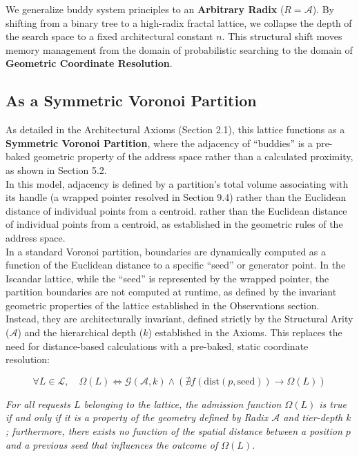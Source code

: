 \documentclass[11pt]{article}
\begin{document}
We generalize buddy system principles to an \textbf{Arbitrary Radix} ($R=\mathcal{A}$). By shifting from a binary tree to a high-radix fractal lattice, we collapse the depth of the search space to a fixed architectural constant $n$. This structural shift moves memory management from the domain of probabilistic searching to the domain of \textbf{Geometric Coordinate Resolution}.

\subsection{As a Symmetric Voronoi Partition}
As detailed in the Architectural Axioms (Section 2.1), this lattice functions as a \textbf{Symmetric Voronoi Partition}, where the adjacency of ``buddies'' is a pre-baked geometric property of the address space rather than a calculated proximity, as shown in Section 5.2.\\ 

In this model, adjacency is defined by a partition's total volume associating with its handle (a wrapped pointer resolved in Section 9.4) rather than the Euclidean distance of individual points from a centroid. rather than the Euclidean distance of individual points from a centroid, as established in the geometric rules of the address space.\\

In a standard Voronoi partition, boundaries are dynamically computed as a function of the Euclidean distance to a specific ``seed'' or generator point. In the Iscandar lattice, while the ``seed'' is represented by the wrapped pointer, the partition boundaries are not computed at runtime, as defined by the invariant geometric properties of the lattice established in the Observations section. Instead, they are architecturally invariant, defined strictly by the Structural Arity ($\mathcal{A}$) and the hierarchical depth ($k$) established in the Axioms. This replaces the need for distance-based calculations with a pre-baked, static coordinate resolution:

\begin{equation}
    \forall L \in \mathcal{L}, \quad \Omega(L) \iff \mathcal{G}(\mathcal{A}, k) \land \left( \nexists f(\text{dist}(p, \text{seed})) \to \Omega(L) \right)
    \label{eq:omega_logic}
\end{equation}

\begin{list}{}{
    \leftmargin=0.75in
    \rightmargin=0.75in
}
\item \small \itshape
\noindent For all requests $L$ belonging to the lattice, the admission function $\Omega(L)$ is true if and only if it is a property of the geometry defined by Radix $\mathcal{A}$ and tier-depth $k$; furthermore, there exists no function of the spatial distance between a position $p$ and a previous seed that influences the outcome of $\Omega(L)$.
\end{list}
\vspace{1em}
\end{document}
